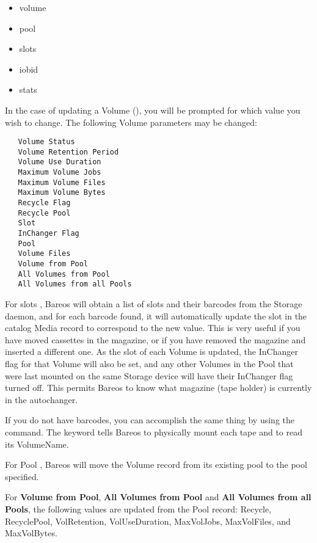 \begin{description}
    \begin{itemize}
      \item volume
      \item pool
      \item slots
      \item iobid
      \item stats
    \end{itemize}

In the case of updating a  Volume (),
you will be prompted for which value you
wish to change.  The following Volume parameters may be changed:

\footnotesize
\begin{verbatim}
   Volume Status
   Volume Retention Period
   Volume Use Duration
   Maximum Volume Jobs
   Maximum Volume Files
   Maximum Volume Bytes
   Recycle Flag
   Recycle Pool
   Slot
   InChanger Flag
   Pool
   Volume Files
   Volume from Pool
   All Volumes from Pool
   All Volumes from all Pools
\end{verbatim}
\normalsize

   For slots , Bareos will obtain a list of slots and
   their barcodes from the Storage daemon, and for each barcode found, it
   will automatically update the slot in the catalog Media record to
   correspond to the new value.  This is very useful if you have moved
   cassettes in the magazine, or if you have removed the magazine and
   inserted a different one.  As the slot of each Volume is updated, the
   InChanger flag for that Volume will also be set, and any other Volumes
   in the Pool that were last mounted on the same Storage device
   will have their InChanger flag turned off.  This permits
   Bareos to know what magazine (tape holder) is currently in the
   autochanger.

   If you do not have barcodes, you can accomplish the same thing
   by using the  command.
   The  keyword tells Bareos to physically mount each tape and to
   read its VolumeName.

   For Pool , Bareos will move the Volume record from its
   existing pool to the pool specified.

   For {\bf Volume from Pool}, {\bf All Volumes from Pool} and {\bf All Volumes
     from all Pools}, the following values are updated from the Pool record:
   Recycle, RecyclePool, VolRetention, VolUseDuration, MaxVolJobs, MaxVolFiles,
   and MaxVolBytes.


\end{description}
